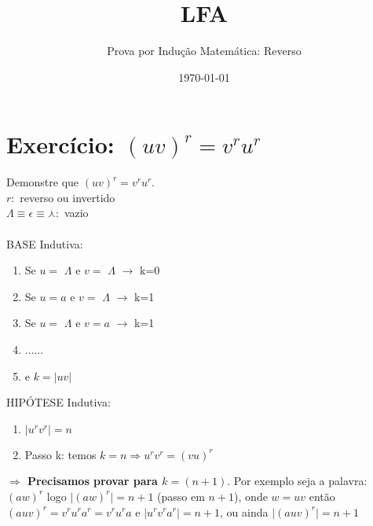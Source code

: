 \documentclass[a4paper,12pt]{article}
\title{LFA}
\author{Prova por Indução Matemática: Reverso}
\date{\today}
\begin{document}
\maketitle

\section{Exercício: $(uv)^r=v^ru^r$}

 Demonstre que $(uv)^r=v^ru^r$.\\
	$r:$ reverso ou invertido\\
	$\Lambda \equiv \epsilon \equiv  \curlywedge:$ vazio\\\\
	
	\vspace{1cm}
	BASE Indutiva:
	\begin{enumerate}
		
	
		\item Se $u=$ $\Lambda$ e $v=$ $\Lambda$ $\rightarrow$ k=0
		\item Se $u=a$ e $v=$ $\Lambda$ $\rightarrow$ k=1
		\item Se $u=$ $\Lambda$ e $v=a$ $\rightarrow$ k=1
		\item ...... 
		\item e $k=|uv|$\\ 
		
	
		
			
	\end{enumerate}
	
		\vspace{1cm}
	HIPÓTESE  Indutiva:
	\begin{enumerate}
	    \item $\mid u^rv^r \mid = n$
		\item Passo k: temos	$k=n \Rightarrow u^rv^r = (vu)^r$\\
		
	\end{enumerate}
	\vspace{1cm}	
			\textbf{$\Rightarrow$ Precisamos provar para $k=(n+1)$}. Por exemplo seja a palavra: $(aw)^r$ logo $\mid (aw)^r \mid = n+1$ (passo em $n+1$),
			 onde \underline{$w=uv$} então 
			$(auv)^r=v^ru^ra^r=v^ru^ra$ e $\mid u^rv^ra^r \mid = n+1$, ou ainda $\mid (auv)^r \mid = n+1$
			
\end{document}
